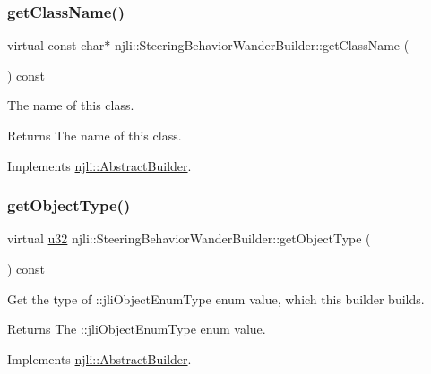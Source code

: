 \subsubsection{\texorpdfstring{get\+Class\+Name()}{getClassName()}}
{\footnotesize\ttfamily virtual const char$\ast$ njli\+::\+Steering\+Behavior\+Wander\+Builder\+::get\+Class\+Name (\begin{DoxyParamCaption}{ }\end{DoxyParamCaption}) const\hspace{0.3cm}{\ttfamily [virtual]}}

The name of this class.

\begin{DoxyReturn}{Returns}
The name of this class. 
\end{DoxyReturn}


Implements \mbox{\hyperlink{classnjli_1_1_abstract_builder_a902f73ea78031b06aca183a417f3413b}{njli\+::\+Abstract\+Builder}}.

\mbox{\label{classnjli_1_1_steering_behavior_wander_builder_aa814427a170e48aea2a8876a2882e6eb}} 
\subsubsection{\texorpdfstring{get\+Object\+Type()}{getObjectType()}}
{\footnotesize\ttfamily virtual \mbox{\hyperlink{_util_8h_a10e94b422ef0c20dcdec20d31a1f5049}{u32}} njli\+::\+Steering\+Behavior\+Wander\+Builder\+::get\+Object\+Type (\begin{DoxyParamCaption}{ }\end{DoxyParamCaption}) const\hspace{0.3cm}{\ttfamily [virtual]}}

Get the type of \+::jli\+Object\+Enum\+Type enum value, which this builder builds.

\begin{DoxyReturn}{Returns}
The \+::jli\+Object\+Enum\+Type enum value. 
\end{DoxyReturn}


Implements \mbox{\hyperlink{classnjli_1_1_abstract_builder_a0f2d344fcf697b167f4f2b1122b5fb33}{njli\+::\+Abstract\+Builder}}.

